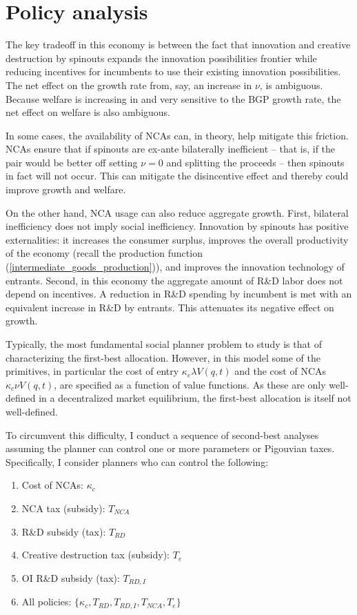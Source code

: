 \documentclass[11pt,english]{article}
\theoremstyle{remark}
\begin{document}
\section{Policy analysis}

The key tradeoff in this economy is between the fact that innovation and creative destruction by spinouts expands the innovation possibilities frontier while reducing incentives for incumbents to use their existing innovation possibilities. The net effect on the growth rate from, say, an increase in $\nu$, is ambiguous. Because welfare is increasing in and very sensitive to the BGP growth rate, the net effect on welfare is also ambiguous.

In some cases, the availability of NCAs can, in theory, help mitigate this friction. NCAs ensure that if spinouts are ex-ante bilaterally inefficient -- that is, if the pair would be better off setting $\nu = 0$ and splitting the proceeds -- then spinouts in fact will not occur. This can mitigate the disincentive effect and thereby could improve growth and welfare. 

On the other hand, NCA usage can also reduce aggregate growth. First, bilateral inefficiency does not imply social inefficiency. Innovation by spinouts has positive externalities: it increases the consumer surplus, improves the overall productivity of the economy (recall the production function (\ref{intermediate_goods_production})), and improves the innovation technology of entrants. Second, in this economy the aggregate amount of R\&D labor does not depend on incentives. A reduction in R\&D spending by incumbent is met with an equivalent increase in R\&D by entrants. This attenuates its negative effect on growth. 

Typically, the most fundamental social planner problem to study is that of characterizing the first-best allocation. However, in this model some of the primitives, in particular the cost of entry $\kappa_e \lambda V(q,t)$ and the cost of NCAs $\kappa_c \nu V(q,t)$, are specified as a function of value functions. As these are only well-defined in a decentralized market equilibrium, the first-best allocation is itself not well-defined.

To circumvent this difficulty, I conduct a sequence of second-best analyses assuming the planner can control one or more parameters or Pigouvian taxes. Specifically, I consider planners who can control the following: 

\begin{enumerate}
	\item Cost of NCAs: $\kappa_c$ 
	\item NCA tax (subsidy): $T_{NCA}$
	\item R\&D subsidy (tax): $T_{RD}$
	\item Creative destruction tax (subsidy): $T_e$
	\item OI R\&D subsidy (tax): $T_{RD,I}$
	\item All policies: $\{\kappa_c, T_{RD}, T_{RD,I}, T_{NCA}, T_e\}$
\end{enumerate}
\end{document}
